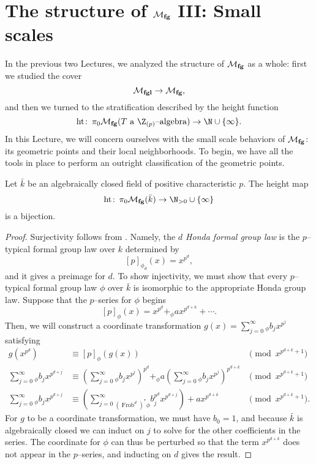 \section{The structure of \texorpdfstring{$\mathcal{M}_{\mathbf{fg}}$}{Mfg} III: Small scales}\label{SectionMfgSmallScales}

In the previous two Lectures, we analyzed the structure of $\mathcal{M}_{\mathbf{fg}}$ as a whole: first we studied the cover \[\mathcal{M}_{\mathbf{fgl}} \to \mathcal{M}_{\mathbf{fg}},\] and then we turned to the stratification described by the height function \[\height\co \pi_0 \moduli{fg}(\text{$T$ a $\Z_{(p)}$--algebra}) \to \N \cup \{\infty\}.\]  In this Lecture, we will concern ourselves with the small scale behaviors of $\mathcal{M}_{\mathbf{fg}}$: its geometric points and their local neighborhoods.  To begin, we have all the tools in place to perform an outright classification of the geometric points.

\begin{theorem}\label{FGpsOverAlgClosedFields}
Let $\bar k$ be an algebraically closed field of positive characteristic $p$.  The height map \[\height\co \pi_0 \moduli{fg}(\bar k) \to \N_{> 0} \cup \{\infty\}\] is a bijection.
\end{theorem}
\begin{proof}
Surjectivity follows from .  Namely, the \textit{$d${\th} Honda formal group law} is the $p$--typical formal group law over $k$ determined by \[[p]_{\phi_d}(x) = x^{p^d},\] and it gives a preimage for $d$.  To show injectivity, we must show that every $p$--typical formal group law $\phi$ over $\bar k$ is isomorphic to the appropriate Honda group law.  Suppose that the $p$--series for $\phi$ begins \[[p]_\phi(x) = x^{p^d} +_\phi a x^{p^{d+k}} + \cdots.\]  Then, we will construct a coordinate transformation $g(x) = \sum_{j=0}^\infty{}_\phi b_j x^{p^j}$ satisfying
\begin{align*}
g(x^{p^d}) & \equiv [p]_\phi(g(x)) & \pmod{x^{p^{d+k} + 1}} \\
\sum_{j=0}^\infty {}_\phi b_j x^{p^{d+j}} & \equiv \left( \sum_{j=0}^\infty {}_\phi b_j x^{p^j} \right)^{p^d} +_\phi a \left( \sum_{j=0}^\infty {}_\phi b_j x^{p^j} \right)^{p^{d+k}} & \pmod{x^{p^{d+k} + 1}} \\
\sum_{j=0}^\infty {}_\phi b_j x^{p^{d+j}} & \equiv \left( \sum_{j=0}^\infty {}_{(\operatorname{Frob}^d)^* \phi} b_j^{p^d} x^{p^{d+j}} \right) + a x^{p^{d+k}} & \pmod{x^{p^{d+k} + 1}}.
\end{align*}
For $g$ to be a coordinate transformation, we must have $b_0 = 1$, and because $\bar k$ is algebraically closed we can induct on $j$ to solve for the other coefficients in the series.  The coordinate for $\phi$ can thus be perturbed so that the term $x^{p^{d+k}}$ does not appear in the $p$--series, and inducting on $d$ gives the result.
\end{proof}

